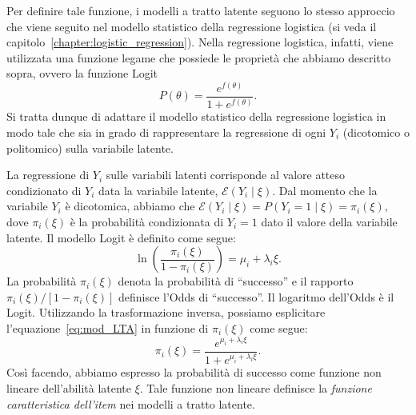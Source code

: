 Per definire tale funzione, i modelli a tratto latente seguono lo stesso approccio che viene seguito nel modello statistico della regressione logistica (si veda il capitolo~\ref{chapter:logistic_regression}).  
Nella regressione logistica, infatti, viene utilizzata una funzione legame che possiede le proprietà che abbiamo descritto sopra, ovvero la funzione Logit $$P(\theta) = \frac{e^{f(\theta)}}{1+e^{f(\theta)}}.$$ 
Si tratta dunque di adattare il modello statistico della regressione logistica in modo tale che sia in grado di rappresentare la regressione di ogni $Y_i$ (dicotomico o politomico) sulla variabile latente.

La regressione di $Y_i$ sulle variabili latenti corrisponde al valore atteso condizionato di $Y_i$ data la variabile latente, $\mathscr{E}(Y_i \mid \xi)$. 
Dal momento che la variabile $Y_i$ è dicotomica, abbiamo che $\mathscr{E}(Y_i \mid \xi) = P(Y_i=1 \mid \xi)=\pi_i(\xi)$, dove $\pi_i(\xi)$ è la probabilità condizionata di $Y_i = 1$ dato il valore della variabile latente. 
Il modello Logit è definito come segue:
\begin{equation}
\ln \left(\frac{\pi_i(\xi)}{1-\pi_i(\xi)}\right)=\mu_i + \lambda_{i}\xi.
\label{eq:mod_LTA}
\end{equation}
La probabilità $\pi_i(\xi)$ denota la probabilità di ``successo'' e il rapporto $\pi_i(\xi)/[1-\pi_i(\xi)]$ definisce l'Odds di ``successo''.  
Il logaritmo dell'Odds è il Logit.  
Utilizzando la trasformazione inversa, possiamo esplicitare l'equazione~\ref{eq:mod_LTA} in funzione di $\pi_i(\xi)$ come segue: 
\begin{equation}
\pi_i(\xi) = \frac{ e^{\mu_i +\lambda_{i}\xi} }{1+e^{\mu_i +  \lambda_{i}\xi}}.
\label{eq:mod_LTA_prob1}
\end{equation}
Così facendo, abbiamo espresso la probabilità di successo come funzione non lineare dell'abilità latente $\xi$.
Tale funzione non lineare definisce la \emph{funzione caratteristica dell'item} nei modelli a tratto latente.

